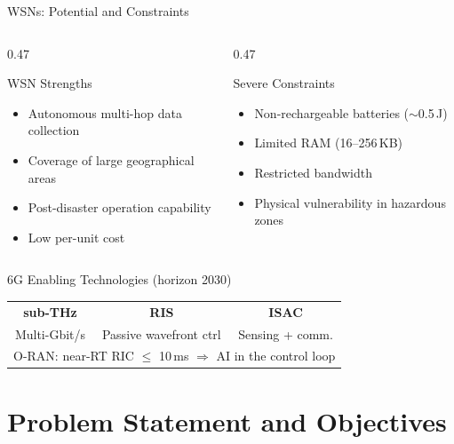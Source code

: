 \documentclass[10pt,aspectratio=169]{beamer}
\begin{document}
\begin{frame}[t]{WSNs: Potential and Constraints}
\begin{columns}[T]
\begin{column}{0.47\textwidth}
  \begin{exampleblock}{WSN Strengths}
    \begin{itemize}\small\setlength{\itemsep}{1pt}
      \item Autonomous multi-hop data collection
      \item Coverage of large geographical areas
      \item Post-disaster operation capability
      \item Low per-unit cost
    \end{itemize}
  \end{exampleblock}
\end{column}
\begin{column}{0.47\textwidth}
  \begin{alertblock}{Severe Constraints}
    \begin{itemize}\small\setlength{\itemsep}{1pt}
      \item Non-rechargeable batteries ($\sim$0.5\,J)
      \item Limited RAM (16--256\,KB)
      \item Restricted bandwidth
      \item Physical vulnerability in hazardous zones
    \end{itemize}
  \end{alertblock}
\end{column}
\end{columns}
\vspace{2pt}
\begin{block}{6G Enabling Technologies (horizon 2030)}
  \centering\footnotesize
  \begin{tabular}{ccc}
    \textbf{sub-THz} & \textbf{RIS} & \textbf{ISAC} \\
    Multi-Gbit/s & Passive wavefront ctrl & Sensing + comm. \\
    \midrule
    \multicolumn{3}{c}{O-RAN: near-RT RIC $\leq$ 10\,ms $\Rightarrow$ AI in the control loop}
  \end{tabular}
\end{block}
\end{frame}

\section{Problem Statement and Objectives}
\end{document}
